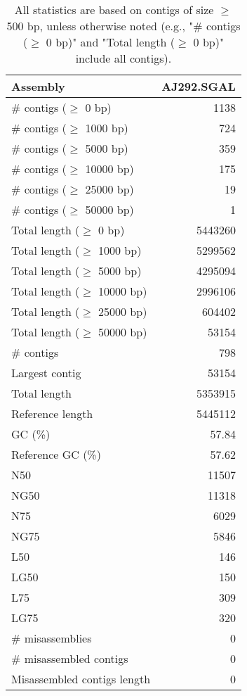 \documentclass[12pt,a4paper]{article}
\begin{document}
\begin{table}[ht]
\begin{center}
\caption{All statistics are based on contigs of size $\geq$ 500 bp, unless otherwise noted (e.g., "\# contigs ($\geq$ 0 bp)" and "Total length ($\geq$ 0 bp)" include all contigs).}
\begin{tabular}{|l*{1}{|r}|}
\hline
Assembly & AJ292.SGAL \\ \hline
\# contigs ($\geq$ 0 bp) & 1138 \\ \hline
\# contigs ($\geq$ 1000 bp) & 724 \\ \hline
\# contigs ($\geq$ 5000 bp) & 359 \\ \hline
\# contigs ($\geq$ 10000 bp) & 175 \\ \hline
\# contigs ($\geq$ 25000 bp) & 19 \\ \hline
\# contigs ($\geq$ 50000 bp) & 1 \\ \hline
Total length ($\geq$ 0 bp) & 5443260 \\ \hline
Total length ($\geq$ 1000 bp) & 5299562 \\ \hline
Total length ($\geq$ 5000 bp) & 4295094 \\ \hline
Total length ($\geq$ 10000 bp) & 2996106 \\ \hline
Total length ($\geq$ 25000 bp) & 604402 \\ \hline
Total length ($\geq$ 50000 bp) & 53154 \\ \hline
\# contigs & 798 \\ \hline
Largest contig & 53154 \\ \hline
Total length & 5353915 \\ \hline
Reference length & 5445112 \\ \hline
GC (\%) & 57.84 \\ \hline
Reference GC (\%) & 57.62 \\ \hline
N50 & 11507 \\ \hline
NG50 & 11318 \\ \hline
N75 & 6029 \\ \hline
NG75 & 5846 \\ \hline
L50 & 146 \\ \hline
LG50 & 150 \\ \hline
L75 & 309 \\ \hline
LG75 & 320 \\ \hline
\# misassemblies & 0 \\ \hline
\# misassembled contigs & 0 \\ \hline
Misassembled contigs length & 0 \\ \hline

\end{tabular}
\end{center}
\end{table}
\end{document}
